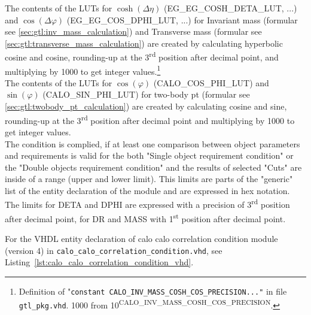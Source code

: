 The contents of the LUTs for $\cosh(\Delta\eta)$ (\small{EG\_EG\_COSH\_DETA\_LUT}\normalsize, ...) and $\cos(\Delta\varphi)$ (\small{EG\_EG\_COS\_DPHI\_LUT}\normalsize, ...) for Invariant mass
(formular see \ref{sec:gtl:inv_mass_calculation}) and Transverse mass (formular see \ref{sec:gtl:transverse_mass_calculation}) are created by calculating hyperbolic cosine and cosine, rounding-up at the 3\textsuperscript{rd} position after decimal point,
and multiplying by 1000 to get integer values.\footnote{Definition of "\texttt{constant \small{CALO\_INV\_MASS\_COSH\_COS\_PRECISION}\normalsize ..."} in file \texttt{gtl\_pkg.vhd}.
1000 from 10\textsuperscript{\tiny{CALO\_INV\_MASS\_COSH\_COS\_PRECISION}}\normalsize.}\\
The contents of the LUTs for $\cos(\varphi)$ (\small{CALO\_COS\_PHI\_LUT}\normalsize) and $\sin(\varphi)$ (\small{CALO\_SIN\_PHI\_LUT}\normalsize) for two-body pt
(formular see \ref{sec:gtl:twobody_pt_calculation}) are created by calculating cosine and sine, rounding-up at the 3\textsuperscript{rd} position after decimal point and 
multiplying by 1000 to get integer values.\\
The condition is complied, if at least one comparison between object parameters and requirements is valid for the both "Single object requirement condition" or the "Double objects requirement condition"
and the results of selected "Cuts" are inside of a range (upper and lower limit).
This limits are parts of the "generic" list of the entity declaration of the module and are expressed in hex notation. The limits for DETA and DPHI
are expressed with a precision of 3\textsuperscript{rd} position after decimal point, for DR and MASS with 1\textsuperscript{st} position after decimal point.

For the VHDL entity declaration of calo calo correlation condition module (version 4) in \texttt{calo\_calo\_correlation\_condition.vhd}, see Listing~\ref{lst:calo_calo_correlation_condition_vhd}.\\
\clearpage


